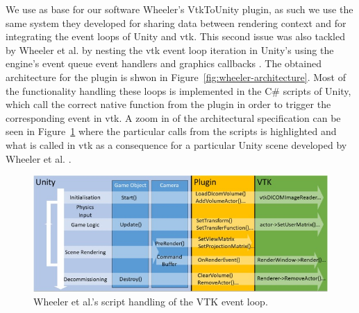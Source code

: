 We use as base for our software Wheeler's VtkToUnity plugin, as such we use the same system they developed for sharing data between rendering context and for integrating the event loops of Unity and \acrshort{vtk}. This second issue was also tackled by Wheeler et al. by nesting the \acrshort{vtk} event loop iteration in Unity's using the engine's event queue event handlers and graphics callbacks \cite{wheeler_virtual_2018}. The obtained architecture for the plugin is shwon in Figure~\ref{fig:wheeler-architecture}. Most of the functionality handling these loops is implemented in the C\# scripts of Unity, which call the correct native function from the plugin in order to trigger the corresponding event in \acrshort{vtk}. A zoom in of the architectural specification can be seen in Figure~\ref{fig:wheeler-architecture-zoomin} where the particular calls from the scripts is highlighted and what is called in \acrshort{vtk} as a consequence for a particular Unity scene developed by Wheeler et al. \cite{wheeler_virtual_2018}.

\begin{figure}[ht!]
    \centering
    \includegraphics[width=\textwidth]{pictures/wheeler_architecture_zoomin.jpg}
    \caption{Wheeler et al.'s script handling of the VTK event loop.}
    \label{fig:wheeler-architecture-zoomin}
\end{figure}

